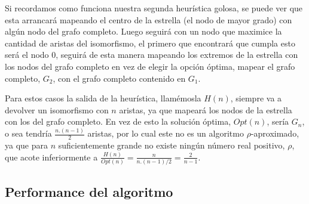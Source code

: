 
Si recordamos como funciona nuestra segunda heurística golosa, se puede ver que esta arrancará mapeando el centro de la estrella (el nodo de mayor grado) con algún nodo del grafo completo. Luego seguirá con un nodo que maximice la cantidad de aristas del isomorfismo, el primero que encontrará que cumpla esto será  el nodo 0, seguirá de esta manera mapeando los extremos de la estrella con los nodos del grafo completo en vez de elegir la opción óptima, mapear el grafo completo, $G_2$, con el grafo completo contenido en $G_1$.

Para estos casos la salida de la heurística, llam\'emosla $H(n)$, siempre va a devolver un isomorfismo con $n$ aristas, ya que mapeará los nodos de la estrella con los del grafo completo. En vez de esto la solución óptima, $Opt(n)$, sería $G_n$, o sea tendría $\frac{n.(n-1)}{2}$ aristas, por lo cual este no es un algoritmo $\rho$-aproximado, ya que para $n$ suficientemente grande no existe ningún número real positivo, $\rho$, que acote inferiormente a $\frac{H(n)}{Opt(n)} = \frac{n}{n.(n-1)/2} = \frac{2}{n-1}$.

\subsection{Performance del algoritmo}


